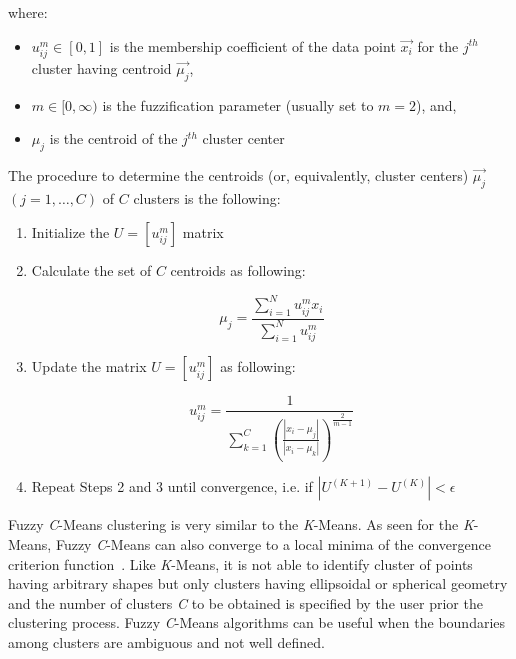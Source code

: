 where:
 \begin{itemize}
   \item $u_{ij}^{m}\in[0,1]$ is the membership coefficient of the data point $\vec{x_{i}}$ for the $j^{th}$ cluster having centroid $\vec{\mu_{j}}$,
   \item $m\in[0,\infty)$ is the fuzzification parameter (usually set to $m=2$), and,
   \item $\mu_{j}$ is the centroid of the $j^{th}$ cluster center
 \end{itemize}

The procedure to determine the centroids (or, equivalently, cluster centers)
$ \vec{\mu_{j}}$ $(j=1,\ldots,C)$ of $C$ clusters is the following:

\begin{enumerate}
  \item Initialize the $U=[u_{ij}^{m}]$ matrix
  \item Calculate the set of $C$ centroids  as following:

          \begin{equation}
            \mu_{j}=\frac{\sum_{i=1}^N u_{ij}^{m}x_{i}}{\sum_{i=1}^N u_{ij}^{m}}
          \end{equation}

  \item Update the matrix $U=[u_{ij}^{m}]$ as following:

          \begin{equation}
            u_{ij}^{m}=\frac{1}{\sum_{k=1}^C (\frac{|x_{i}-\mu_{j}|}{|x_{i}-\mu_{k}|})^{\frac{2}{m-1}}}
          \end{equation}

  \item Repeat Steps 2 and 3 until convergence, i.e. if \begin{math} |U^{(K+1)}-U^{(K)}|<\epsilon \end{math}
\end{enumerate}

Fuzzy \emph{C}-Means clustering is very similar to the \emph{K}-Means. As seen for the \emph{K}-Means, Fuzzy \emph{C}-Means can also converge to a local minima of the convergence criterion function~\cite{FuzzyBezdek}.
Like \emph{K}-Means, it is not able to identify cluster of points having arbitrary shapes but only clusters having ellipsoidal or spherical geometry and the number of clusters \emph{C} to be obtained is specified by the user prior the clustering process.
Fuzzy \emph{C}-Means algorithms can be useful when the boundaries among clusters are ambiguous and not well defined.


